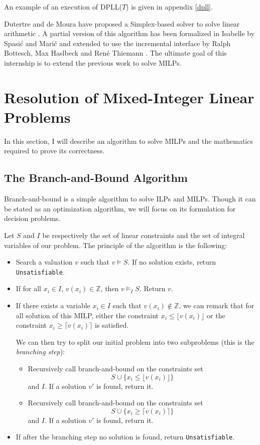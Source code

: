\documentclass{article}
\newcommand{\cunsat}{\texttt{Unsatisfiable}}
\newcommand{\ints}{\mathbb{Z}}
\begin{document}
An example of an execution of DPLL($T$) is given in appendix \ref{dpll}.

Dutertre and de Moura have proposed a Simplex-based solver to solve linear
arithmetic \cite{Dutertre2006}. A partial version of this algorithm has been
formalized in Isabelle by Spasić and Marić \cite{Spasic2012} and extended to
use the incremental interface by Ralph Bottesch, Max Haslbeck and René Thiemann
\cite{Thiemann2018,BHT2019}. The ultimate goal of this internship is to extend the
previous work to solve MILPs.

\section{Resolution of Mixed-Integer Linear Problems}
In this section, I will describe an algorithm to solve MILPs and the mathematics
required to prove its correctness.

\subsection{The Branch-and-Bound Algorithm}
\label{bbdescr}
Branch-and-bound is a simple algorithm to solve ILPs and MILPs. Though it can be
stated as an optimization algorithm, we will focus on its formulation for
decision problems.

Let $S$ and $I$ be respectively the set of linear constraints and the set of
integral variables of our problem. The principle of the algorithm is the
following:
\begin{itemize}
  \item Search a valuation $v$ such that $v \vDash S$. If no solution exists,
    return \cunsat{}.
  \item If for all $x_i \in I$, $v(x_i) \in \ints$, then $v \vDash_I S$.
    Return $v$.
  \item If there exists a variable $x_i \in I$ such that
    $v(x_i) \notin \ints$, we can remark that for all solution of this
    MILP, either the constraint $x_i \leqslant \lfloor v(x_i) \rfloor$ 
    or the constraint $x_i \geqslant \lceil v(x_i) \rceil$ is satisfied.
    
    We can then try to split our initial problem into two subproblems (this is
    the \textit{branching step}):
    \begin{itemize}
      \item Recursively call branch-and-bound on the constraints set
        $$S \cup \{x_i \leqslant \lfloor v(x_i) \rfloor\}$$ and $I$.
        If a solution $v'$ is found, return it.
      \item Recursively call branch-and-bound on the constraints set
        $$S \cup \{x_i \geqslant \lceil v(x_i) \rceil\}$$ and $I$.
        If a solution $v'$ is found, return it.
    \end{itemize}
  \item If after the branching step no solution is found, return \cunsat{}.
\end{itemize}
\end{document}
